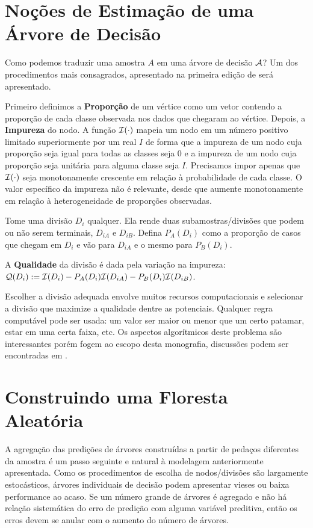 \section{Noções de Estimação de uma Árvore de Decisão}

Como podemos traduzir uma amostra $A$ em uma árvore de decisão $\mathcal{A}$? Um dos procedimentos mais consagrados, apresentado na primeira edição de \cite{breiman2017classification} será apresentado.

Primeiro definimos a \textbf{Proporção} de um vértice como um vetor contendo a proporção de cada classe observada nos dados que chegaram ao vértice. Depois, a \textbf{Impureza} do nodo. A função $\mathcal{I}(\cdot)$ mapeia um nodo em um número positivo limitado superiormente por um real $I$ de forma que a impureza de um nodo cuja proporção seja igual para todas as classes seja $0$ e a impureza de um nodo cuja proporção seja unitária para alguma classe seja $I$. Precisamos impor apenas que $\mathcal{I}(\cdot)$ seja monotonamente crescente em relação à probabilidade de cada classe. O valor específico da impureza não é relevante, desde que aumente monotonamente em relação à heterogeneidade de proporções observadas.

Tome uma divisão $D_i$ qualquer. Ela rende duas subamostras/divisões que podem ou não serem terminais, $D_{iA}$ e $D_{iB}$. Defina $P_A (D_i)$ como a proporção de casos que chegam em $D_i$ e vão para $D_{iA}$ e o mesmo para $P_B (D_i)$.

\begin{defi}
A \textbf{Qualidade} da divisão é dada pela variação na impureza: $\mathcal{Q} (D_i) := \mathcal{I}(D_i) - P_A(D_i) \mathcal{I} (D_{iA}) - P_B(D_i) \mathcal{I} (D_{iB})$.
\end{defi}

 Escolher a divisão adequada envolve muitos recursos computacionais e selecionar a divisão que maximize a qualidade dentre as potenciais. Qualquer regra computável pode ser usada: um valor ser maior ou menor que um certo patamar, estar em uma certa faixa, etc. Os aspectos algorítmicos deste problema são interessantes porém fogem ao escopo desta monografia, discussões podem ser encontradas em .
 
 \section{Construindo uma Floresta Aleatória}
 
 A agregação das predições de árvores construídas a partir de pedaços diferentes da amostra é um passo seguinte e natural à modelagem anteriormente apresentada. Como os procedimentos de escolha de nodos/divisões são largamente estocásticos, árvores individuais de decisão podem apresentar vieses ou baixa performance ao acaso. Se um número grande de árvores é agregado e não há relação sistemática do erro de predição com alguma variável preditiva, então os erros devem se anular com o aumento do número de árvores.
 

